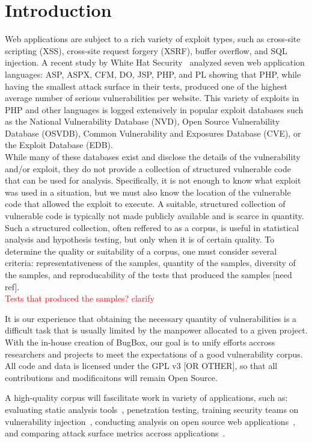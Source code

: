 \documentclass[letterpaper,twocolumn,10pt]{article}
\begin{document}
\section{Introduction}
Web applications are subject to a rich variety of exploit types, such as cross-site scripting (XSS), cross-site request forgery (XSRF), buffer overflow, and SQL injection.  A recent study by White Hat Security~\cite{WhiteHat:2010:Online} analyzed seven web application languages: ASP, ASPX, CFM, DO, JSP, PHP, and PL showing that PHP, while having the smallest attack surface in their tests, produced one of the highest average number of serious vulnerabilities per website.  This variety of exploits in PHP and other languages is logged extensively in popular exploit databases such as the National Vulnerability Database (NVD), Open Source Vulnerability Database (OSVDB), Common Vulnerability and Exposures Database (CVE), or the Exploit Database (EDB).\\

While many of these databases exist and disclose the details of the vulnerability and/or exploit, they do not provide a collection of structured vulnerable code that can be used for analysis.  Specifically, it is not enough to know what exploit was used in a situation, but we must also know the location of the vulnerable code that allowed the exploit to execute.  A suitable, structured collection of vulnerable code is typically not made publicly available and is scarce in quantity.  Such a structured collection, often reffered to as a corpus, is useful in statistical analysis and hypothesis testing, but only when it is of certain quality.  To determine the quality or suitability of a corpus, one must consider several criteria: representativeness of the samples, quantity of the samples, diversity of the samples, and reproducability of the tests that produced the samples [need ref].\\
\textcolor{red}{ Tests that produced the samples? clarify }
 
It is our experience that obtaining the necessary quantity of vulnerabilities is a difficult task that is usually limited by the manpower allocated to a given project. With the in-house creation of BugBox, our goal is to unify efforts accross researchers and projects to meet the expectations of a good vulnerability corpus. All code and data is licensed under the GPL v3 [OR OTHER], so that all contributions and modificaitons will remain Open Source. 


A high-quality corpus will fascilitate work in variety of applications, such as: evaluating static analysis tools~\cite{Zitser:2004:TSA:1041685.1029911}, penetration testing, training security teams on vulnerability injection~\cite{4725309}, conducting analysis on open source web applications~\cite{DBLP:journals/ese/HuynhM10}, and comparing attack surface metrics accross applications~\cite{Stuckman:2012:CAA:2372225.2372229}.\\
\end{document}
